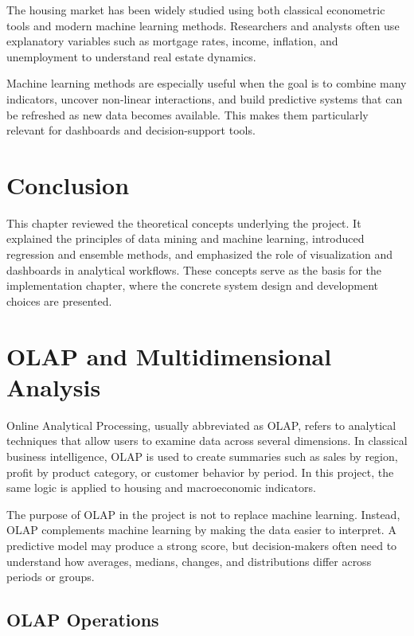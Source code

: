 The housing market has been widely studied using both classical econometric tools and modern machine learning methods.
Researchers and analysts often use explanatory variables such as mortgage rates, income, inflation, and unemployment to understand real estate dynamics.

Machine learning methods are especially useful when the goal is to combine many indicators, uncover non-linear interactions, and build predictive systems that can be refreshed as new data becomes available.
This makes them particularly relevant for dashboards and decision-support tools.

\section{Conclusion}

This chapter reviewed the theoretical concepts underlying the project.
It explained the principles of data mining and machine learning, introduced regression and ensemble methods, and emphasized the role of visualization and dashboards in analytical workflows.
These concepts serve as the basis for the implementation chapter, where the concrete system design and development choices are presented.

\section{OLAP and Multidimensional Analysis}

Online Analytical Processing, usually abbreviated as OLAP, refers to analytical techniques that allow users to examine data across several dimensions. In classical business intelligence, OLAP is used to create summaries such as sales by region, profit by product category, or customer behavior by period. In this project, the same logic is applied to housing and macroeconomic indicators.

The purpose of OLAP in the project is not to replace machine learning. Instead, OLAP complements machine learning by making the data easier to interpret. A predictive model may produce a strong score, but decision-makers often need to understand how averages, medians, changes, and distributions differ across periods or groups.

\subsection{OLAP Operations}

